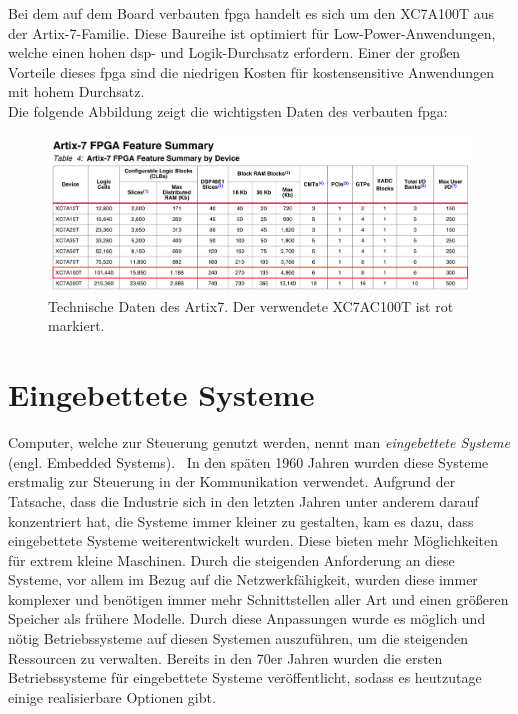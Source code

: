 Bei dem auf dem Board verbauten \ac{fpga} handelt es sich um den  XC7A100T aus der Artix-7-Familie. Diese Baureihe ist optimiert für Low-Power-Anwendungen, welche einen hohen \ac{dsp}- und Logik-Durchsatz erfordern. Einer der großen Vorteile
dieses \ac{fpga} sind die niedrigen Kosten für kostensensitive Anwendungen mit hohem Durchsatz.\\
Die folgende Abbildung zeigt die wichtigsten Daten des verbauten \ac{fpga}:~\cite{artix7}\\


\begin{figure}[H]
\centering
\includegraphics[width=1\textwidth]{Hauptteil/artix7.png}
\caption{Technische Daten des Artix7. Der verwendete XC7AC100T ist rot markiert.~\cite{artix7}}\label{fig:artix7}
\end{figure}

\section{Eingebettete Systeme}\label{kap:eingebettetesysteme}

Computer, welche zur Steuerung genutzt werden, nennt man \emph{eingebettete Systeme} (engl. Embedded Systems).~\cite{ibm} In den späten 1960 Jahren wurden diese Systeme erstmalig zur Steuerung in der Kommunikation verwendet. Aufgrund der Tatsache,
dass die Industrie sich in den letzten Jahren unter anderem darauf konzentriert hat, die Systeme immer kleiner zu gestalten, kam es dazu, dass eingebettete Systeme weiterentwickelt wurden. Diese bieten mehr Möglichkeiten für extrem kleine Maschinen.
Durch die steigenden Anforderung an diese Systeme, vor allem im Bezug auf die Netzwerkfähigkeit, wurden diese immer komplexer und benötigen immer mehr Schnittstellen aller Art und einen größeren Speicher als frühere Modelle. Durch diese Anpassungen wurde es
möglich und nötig Betriebssysteme auf diesen Systemen auszuführen, um die steigenden Ressourcen zu verwalten. Bereits in den 70er Jahren wurden die ersten Betriebssysteme für eingebettete Systeme veröffentlicht, sodass es heutzutage einige
realisierbare Optionen gibt.\cite{ibm}\\

